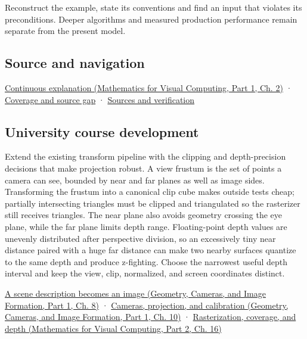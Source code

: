 \hypertarget{appendix-1c07d64f5e70-recall-and-next-depth}{}

Reconstruct the example, state its conventions and find an input that violates its preconditions. Deeper algorithms and measured production performance remain separate from the present model.

\subsection{Source and navigation}\label{appendix-1c07d64f5e70-source-and-navigation}

\hypertarget{appendix-1c07d64f5e70-source-and-navigation}{}

\href{../02-Mathematics-for-Visual-Computing-P01/main.pdf\#01-foundations-i-ch018-keep-the-promises-visible-while-moving-between-representations}{Continuous explanation (Mathematics for Visual Computing, Part 1, Ch. 2)} · \hyperref[appendix-fd090d982a15-phase-7---parts-601-700]{Coverage and source gap} · \hyperref[appendix-a103e7846d21-phase-7---source-analysis-and-verification]{Sources and verification}

\subsection{University course development}\label{appendix-1c07d64f5e70-university-course-development}

\hypertarget{appendix-1c07d64f5e70-university-course-development}{}

Extend the existing transform pipeline with the clipping and depth-precision decisions that make projection robust. A view frustum is the set of points a camera can see, bounded by near and far planes as well as image sides. Transforming the frustum into a canonical clip cube makes outside tests cheap; partially intersecting triangles must be clipped and triangulated so the rasterizer still receives triangles. The near plane also avoids geometry crossing the eye plane, while the far plane limits depth range. Floating-point depth values are unevenly distributed after perspective division, so an excessively tiny near distance paired with a huge far distance can make two nearby surfaces quantize to the same depth and produce z-fighting. Choose the narrowest useful depth interval and keep the view, clip, normalized, and screen coordinates distinct.

\href{../03-Geometry-Cameras-and-Image-Formation-P01/main.pdf\#03-visual-computing-i-ch001-a-scene-description-becomes-an-image}{A scene description becomes an image (Geometry, Cameras, and Image Formation, Part 1, Ch. 8)} · \href{../03-Geometry-Cameras-and-Image-Formation-P01/main.pdf\#03-visual-computing-i-ch003-cameras-projection-and-calibration}{Cameras, projection, and calibration (Geometry, Cameras, and Image Formation, Part 1, Ch. 10)} · \href{../02-Mathematics-for-Visual-Computing-P02/main.pdf\#03-visual-computing-i-ch012-rasterization-coverage-and-depth}{Rasterization, coverage, and depth (Mathematics for Visual Computing, Part 2, Ch. 16)}

